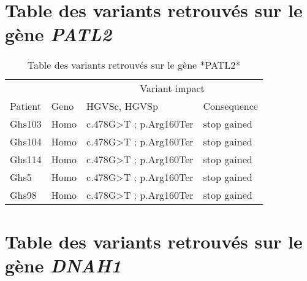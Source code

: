\documentclass[12pt,twoside]{reedthesis}
\theoremstyle{definition}
\theoremstyle{definition}
\theoremstyle{remark}
\begin{document}
  \chapter{\texorpdfstring{Table des variants retrouvés sur le gène
  \emph{PATL2}}{Table des variants retrouvés sur le gène PATL2}}\label{table-des-variants-retrouves-sur-le-gene-patl2}
  
  \begin{longtable}[t]{llll}
  \caption{\label{tab:tabpatl2}Table des variants retrouvés sur le gène *PATL2*}\\
  \toprule
  \multicolumn{2}{c}{ } & \multicolumn{2}{c}{Variant impact} \\
  \cmidrule(l{2pt}r{2pt}){3-4}
  Patient & Geno & HGVSc, HGVSp & Consequence\\
  \midrule
  Ghs103 & Homo & c.478G>T ; p.Arg160Ter & stop gained\\
  Ghs104 & Homo & c.478G>T ; p.Arg160Ter & stop gained\\
  Ghs114 & Homo & c.478G>T ; p.Arg160Ter & stop gained\\
  Ghs5 & Homo & c.478G>T ; p.Arg160Ter & stop gained\\
  Ghs98 & Homo & c.478G>T ; p.Arg160Ter & stop gained\\
  \bottomrule
  \end{longtable}
  
  \newpage
  
  \chapter{\texorpdfstring{Table des variants retrouvés sur le gène
  \emph{DNAH1}}{Table des variants retrouvés sur le gène DNAH1}}\label{table-des-variants-retrouves-sur-le-gene-dnah1}
  
\end{document}
